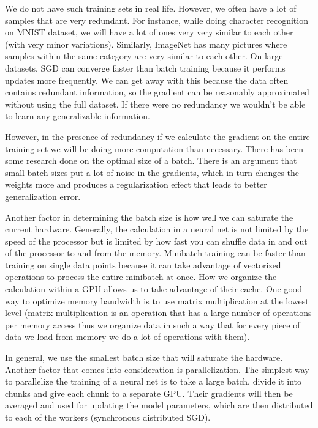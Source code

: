 We do not have such training sets in real life. However, we often have a lot of samples that are very redundant. 
For instance, while doing character recognition on MNIST dataset, we will have a lot of ones very very similar to each other (with very minor variations). 
Similarly, ImageNet has many pictures where samples within the same category are very similar to each other. 
On large datasets, SGD can converge faster than batch training because it performs updates more frequently.
We can get away with this because the data often contains redundant information, so the gradient can be reasonably approximated without using the full dataset. 
If there were no redundancy we wouldn’t be able to learn any generalizable information.

However, in the presence of redundancy if we calculate the gradient on the entire training set we will be doing more computation than necessary. 
There has been some research done on the optimal size of a batch. 
There is an argument that small batch sizes put a lot of noise in the gradients, which in turn changes the weights more and produces a  regularization effect that leads to better generalization error.

Another factor in determining the batch size is how well we can saturate the current hardware.
Generally, the calculation in a neural net is not limited by the speed of the processor but is limited by how fast you can shuffle data in and out of the processor to and from the memory. 
Minibatch training can be faster than training on single data points because it can take advantage of vectorized operations to process the entire minibatch at once. 
How we organize the calculation within a GPU allows us to take advantage of their cache. 
One good way to optimize memory bandwidth is to use matrix multiplication at the lowest level (matrix multiplication is an operation that has a large number of operations per memory access thus we organize data in such a way that for every piece of data we load from memory we do a lot of operations with them).

In general, we use the smallest batch size that will saturate the hardware. 
Another factor that comes into consideration is parallelization. 
The simplest way to parallelize the training of a neural net is to take a large batch,  divide it into chunks and give each chunk to a separate GPU. 
Their gradients will then be averaged and used for updating the model parameters, which are then distributed to each of the workers (synchronous distributed SGD).

